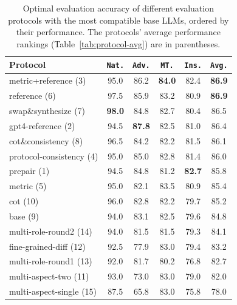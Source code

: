 \documentclass[11pt]{article}
\newcommand{\natshort}{\texttt{Nat.}\xspace}
\newcommand{\advshort}{\texttt{Adv.}\xspace}
\newcommand{\mtshort}{\texttt{MT.}\xspace}
\newcommand{\insshort}{\texttt{Ins.}\xspace}
\begin{document}
\begin{table}[t!]
\small
\centering
\addtolength{\tabcolsep}{-2pt} 
\begin{tabular}{@{}lccccc@{}}
\toprule
\textbf{Protocol} & \textbf{\natshort} & \textbf{\advshort} & \textbf{\mtshort}  & \textbf{\insshort} & \textbf{\texttt{Avg.}}\\
\midrule
 metric+reference (3)    & 95.0             & 86.2                 & \textbf{84.0} & 82.4            & \textbf{86.9} \\
 reference  (6)          & 97.5             & 85.9                 & 83.2          & 80.9            & \textbf{86.9} \\
 swap\&synthesize (7)    & \textbf{98.0}    & 84.8                 & 82.7          & 80.4            & 86.5          \\
 gpt4-reference (2)      & 94.5             & \textbf{87.8}        & 82.5          & 81.0            & 86.4          \\
 cot\&consistency (8)    & 96.5             & 84.2                 & 82.2          & 81.5            & 86.1          \\
 protocol-consistency (4) & 95.0             & 85.0                 & 82.8          & 81.4            & 86.0          \\
 prepair (1)             & 94.5             & 84.8                 & 81.2          & \textbf{82.7}   & 85.8          \\
 metric (5)              & 95.0             & 82.1                 & 83.5          & 80.9            & 85.4          \\
 cot (10)                 & 96.0             & 82.8                 & 82.2          & 79.7            & 85.2          \\
 base  (9)               & 94.0             & 83.1                 & 82.5          & 79.6            & 84.8          \\
 multi-role-round2 (14)   & 94.0             & 81.5                 & 81.5          & 79.3            & 84.1          \\
 fine-grained-diff (12)    & 92.5             & 77.9                 & 83.0          & 79.4            & 83.2          \\
 multi-role-round1 (13)   & 92.0             & 81.7                 & 80.2          & 76.8            & 82.7          \\
 multi-aspect-two  (11)   & 93.0             & 73.0                 & 83.0          & 79.0            & 82.0          \\
 multi-aspect-single (15)  & 87.5             & 65.8                 & 83.0          & 75.8            & 78.0          \\ 
\bottomrule
\end{tabular}
\addtolength{\tabcolsep}{+2pt} 
\caption{Optimal evaluation accuracy of different evaluation protocols with the most compatible base LLMs, ordered by their performance.
The protocols' average performance rankings (Table~\ref{tab:protocol-avg}) are in parentheses.
% 
}
\label{tab:protocol-best} 
\end{table}
\end{document}
